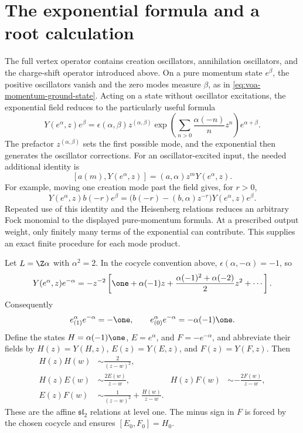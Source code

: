 \section{The exponential formula and a root calculation}

The full vertex operator contains creation oscillators, annihilation
oscillators, and the charge-shift operator introduced above.
On a pure momentum state $e^\beta$, the positive oscillators
vanish and the zero modes measure $\beta$, as in
\eqref{eq:voa-momentum-ground-state}.
Acting on a state without oscillator excitations, the exponential
field reduces to the particularly useful formula
\begin{equation}
 Y(e^\alpha,z)e^\beta
 =\epsilon(\alpha,\beta)z^{(\alpha,\beta)}
   \exp\!\left(\sum_{n>0}\frac{\alpha(-n)}n z^n\right)
   e^{\alpha+\beta}.
 \label{eq:voa-exponential-action}
\end{equation}
The prefactor $z^{(\alpha,\beta)}$ sets the first possible mode,
and the exponential then generates the oscillator corrections.
For an oscillator-excited input, the needed additional identity is
\[
 [a(m),Y(e^\alpha,z)]=(a,\alpha)z^mY(e^\alpha,z).
\]
For example, moving one creation mode past the field gives, for $r>0$,
\[
 Y(e^\alpha,z)b(-r)e^\beta
 =\bigl(b(-r)-(b,\alpha)z^{-r}\bigr)Y(e^\alpha,z)e^\beta.
\]
Repeated use of this identity and the Heisenberg relations reduces
an arbitrary Fock monomial to the displayed pure-momentum formula.
At a prescribed output weight, only finitely many terms of the
exponential can contribute. This supplies an exact finite procedure
for each mode product.

\begin{example}
\label{ex:voa-a1}
Let $L=\Z\alpha$ with $\alpha^2=2$. In the cocycle convention
above, $\epsilon(\alpha,-\alpha)=-1$, so
\[
 Y(e^\alpha,z)e^{-\alpha}
 =-z^{-2}\left[\one+\alpha(-1)z+
 \frac{\alpha(-1)^2+\alpha(-2)}2z^2+\cdots\right].
\]
Consequently
\[
 e^\alpha_{(1)}e^{-\alpha}=-\one,
 \qquad e^\alpha_{(0)}e^{-\alpha}=-\alpha(-1)\one.
\]
Define the states $H=\alpha(-1)\one$, $E=e^\alpha$, and
$F=-e^{-\alpha}$, and abbreviate their fields by
$H(z)=Y(H,z)$, $E(z)=Y(E,z)$, and $F(z)=Y(F,z)$. Then
\begin{align*}
 H(z)H(w)&\sim\frac2{(z-w)^2},\\
 H(z)E(w)&\sim\frac{2E(w)}{z-w},&
 H(z)F(w)&\sim-\frac{2F(w)}{z-w},\\
 E(z)F(w)&\sim\frac1{(z-w)^2}+\frac{H(w)}{z-w}.
\end{align*}
These are the affine $\mathfrak{sl}_2$ relations at level one.
The minus sign in $F$ is forced by the chosen cocycle and ensures
$[E_0,F_0]=H_0$.
\end{example}

